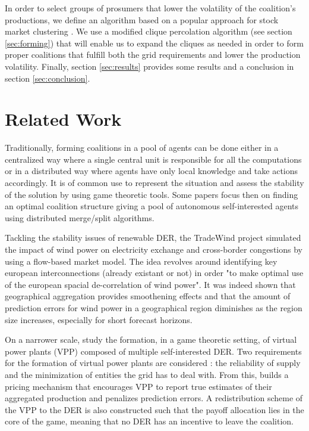 \documentclass[conference]{IEEEtran}
\begin{document}
In order to select groups of prosumers that lower the volatility of the coalition's productions, we define an algorithm based on a popular approach for stock market clustering \cite{Mantegna1999}. We use a modified clique percolation algorithm (see section \ref{sec:forming}) that will enable us to expand the cliques as needed in order to form proper coalitions that fulfill both the grid requirements and lower the production volatility. Finally, section \ref{sec:results} provides some results and a conclusion in section \ref{sec:conclusion}.

%
%

\section{Related Work}
\label{sec:related}

Traditionally, forming coalitions in a pool of agents can be done either in a centralized way where a single central unit is responsible for all the computations or in a distributed way where agents have only local knowledge and take actions accordingly. It is of common use to represent the situation and assess the stability of the solution by using game theoretic tools. Some papers \cite{Saad2009} \cite{Luan2014} focus then on finding an optimal coalition structure giving a pool of autonomous self-interested agents using distributed merge/split algorithms.

Tackling the stability issues of renewable DER, the TradeWind project \cite{Europe} simulated the impact of wind power on electricity exchange and cross-border congestions by using a flow-based market model. The idea revolves around identifying key european interconnections (already existant or not) in order "to make optimal use of the european spacial de-correlation of wind power". It was indeed shown that geographical aggregation provides smoothening effects and that the amount of prediction errors for wind power in a geographical region diminishes as the region size increases, especially for short forecast horizons.

On a narrower scale, \cite{Kota2011} study the formation, in a game theoretic setting, of virtual power plants (VPP) composed of multiple self-interested DER. Two requirements for the formation of virtual power plants are considered : the reliability of supply and the minimization of entities the grid has to deal with. From this, \cite{Kota2011} builds a pricing mechanism that encourages VPP to report true estimates of their aggregated production and penalizes prediction errors. A redistribution scheme of the VPP to the DER is also constructed such that the payoff allocation lies in the core of the game, meaning that no DER has an incentive to leave the coalition.
\end{document}
